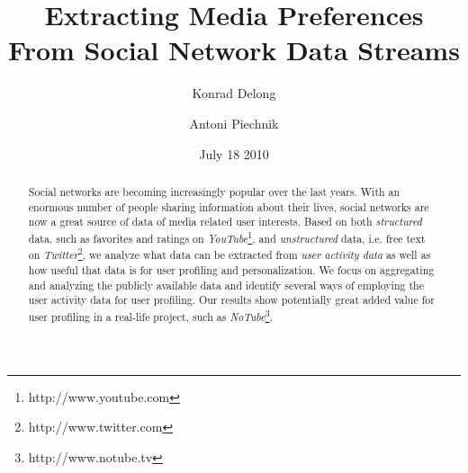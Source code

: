 \documentclass{article}
\def\ie{{i.e. }}
\begin{document}
\title{\textbf{Extracting Media Preferences From Social Network Data Streams}}
\author{Konrad Delong \and Antoni Piechnik}
\date{July 18 2010}

\maketitle

\begin{abstract} Social networks are becoming increasingly popular over the last
years. With an enormous number of people sharing information about their lives,
social networks are now a great source of data of media related user interests. Based on both
\textit{structured} data, such as favorites and ratings on \textit{YouTube}\footnote{http://www.youtube.com},
and \textit{unstructured} data, \ie free text on \textit{Twitter}\footnote{http://www.twitter.com},
we analyze what data can be extracted from \textit{user activity data} as well as how useful that data
is for user profiling and personalization. We focus on aggregating and analyzing the publicly available
data and identify several ways of employing the user activity data for user profiling.
Our results show potentially great added value for user profiling in a real-life project, such as \textit{NoTube}\footnote{http://www.notube.tv}.

\end{abstract}



















\end{document}

